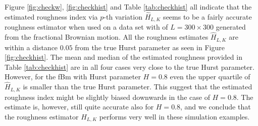 \documentclass{article}
\begin{document}
Figure \ref{fig:checkw}, \ref{fig:checkhist} and Table \ref{tab:checkhist} all indicate that the estimated roughness index via $p$-th variation $\widehat{H}_{L,K}$ seems to be a fairly accurate roughness estimator when used on a data set with of $L=300\times 300$ generated from the fractional Brownian motion. All the roughness estimates $\widehat{H}_{L,K}$ are within a distance $0.05$ from the true Hurst parameter as seen in Figure \ref{fig:checkhist}. The mean and median of the estimated roughness provided in Table \ref{tab:checkhist} are in all four cases very close to the true Hurst parameter. However, for the fBm with Hurst parameter $H=0.8$ even the upper quartile of $\widehat{H}_{L,K}$ is smaller than the true Hurst parameter. This suggest that the estimated roughness index might be slightly biased downwards in the case of $H=0.8$. The estimate is, however, still quite accurate also for $H=0.8$, and we conclude that the roughness estimator $\widehat{H}_{L,K}$ performs very well in these simulation examples.
\end{document}
